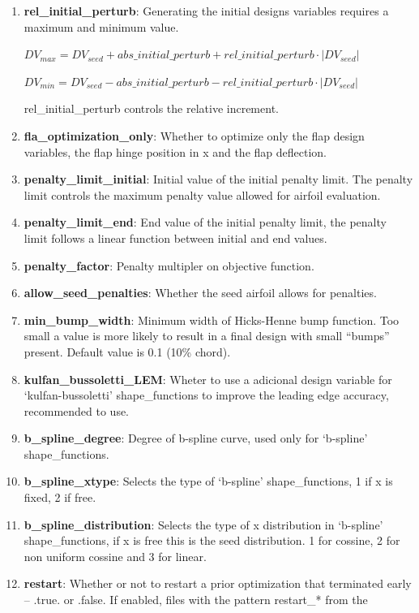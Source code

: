 \documentclass[11pt]{article}
\begin{document}
\begin{enumerate}
{	abs\_initial\_perturb controls the absolute increment.}
\item{\textbf{rel\_initial\_perturb}: Generating the initial designs variables requires a maximum and minimum
	value.
	
	$DV_{max} = DV_{seed} + abs\_initial\_perturb + rel\_initial\_perturb \cdot |DV_{seed}|$
	
	$DV_{min} = DV_{seed} - abs\_initial\_perturb - rel\_initial\_perturb \cdot |DV_{seed}|$
	
	rel\_initial\_perturb controls the relative increment.}
\item{\textbf{fla\_optimization\_only}: Whether to optimize only the flap design variables,
	the flap hinge position in x and the flap deflection.}
\item{\textbf{penalty\_limit\_initial}: Initial value of the initial penalty limit. The penalty limit
	controls the maximum penalty value allowed for airfoil evaluation.}
\item{\textbf{penalty\_limit\_end}: End value of the initial penalty limit, the penalty limit follows
	a linear function between initial and end values.}
\item{\textbf{penalty\_factor}: Penalty multipler on objective function.}
\item{\textbf{allow\_seed\_penalties}: Whether the seed airfoil allows for penalties.}
\item{\textbf{min\_bump\_width}: Minimum width of Hicks-Henne bump function.  Too small a
	value is more likely to result in a final design with small ``bumps'' present.  Default
	value is 0.1 (10\% chord).}
\item{\textbf{kulfan\_bussoletti\_LEM}: Wheter to use a adicional design variable for `kulfan-bussoletti'
	shape\_functions to improve the leading edge accuracy, recommended to use.}
\item{\textbf{b\_spline\_degree}: Degree of b-spline curve, used only for `b-spline'
	shape\_functions.}
\item{\textbf{b\_spline\_xtype}: Selects the type of `b-spline' shape\_functions, 1 if x is fixed, 2 if free.}
\item{\textbf{b\_spline\_distribution}: Selects the type of x distribution in `b-spline' shape\_functions, if x
	is free this is the seed distribution. 1 for cossine, 2 for non uniform cossine and 3 for linear.}
\item{\textbf{restart}: Whether or not to restart a prior optimization that terminated
	early -- .true. or .false.  If enabled, files with the pattern restart\_* from the 
}
\end{enumerate}
\end{document}
